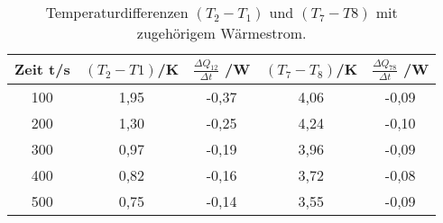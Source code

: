 \begin{table}[H]
  \centering
   \begin{tabular}{c c c c c}
    \toprule
     Zeit t/\;s & $(T_{2}-T{1})$/\;K & $\frac{\Delta Q_{12}}{\Delta t}$ /\;W &
     $(T_{7}-T_{8})$/\;K & $\frac{\Delta Q_{78}}{\Delta t}$ /\;W \\
    \midrule
    100 & 1,95 & -0,37 & 4,06 & -0,09 \\
    200 & 1,30 & -0,25  & 4,24 & -0,10 \\
    300 & 0,97 & -0,19 & 3,96 & -0,09 \\
    400 & 0,82 & -0,16  & 3,72 & -0,08\\
    500 & 0,75 & -0,14  &  3,55 & -0,09\\

    \bottomrule
  \end{tabular}
  \caption{Temperaturdifferenzen $(T_{2}-T_{1})$ und $(T_{7}-T{8})$ mit zugehörigem
  Wärmestrom.}
  \label{tab:tab1}
\end{table}
